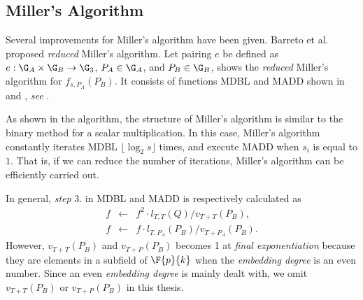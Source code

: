 \subsection{Miller's Algorithm}
Several improvements for Miller's algorithm have been given. Barreto et al. proposed {\it reduced} Miller's algorithm. 
Let pairing $e$ be defined as $e:\G_A\times\G_B\rightarrow\G_3$, $P_A\in\G_A$, and $P_B\in\G_B$,  shows the {\it reduced} Miller's algorithm for $f_{s,P_A}(P_B)$. It consists of functions MDBL and MADD shown in  
and , {\it see} .

As shown in the algorithm, the structure of Miller's algorithm is similar to the binary method for a scalar multiplication.
In this case, Miller's algorithm constantly iterates MDBL $\lfloor\log_2s\rfloor$ times, and execute MADD when $s_i$ is equal to $1$. 
That is, if we can reduce the number of iterations, Miller's algorithm can be efficiently carried out.


In general, {\it step} 3. in MDBL and MADD is respectively calculated as  
\begin{eqnarray*}
f &\leftarrow& f^2\cdot l_{T,T}(Q)/v_{T+T}(P_B),\\
f &\leftarrow& f \cdot l_{T,P_A}(P_B)/v_{T+P_A}(P_B). 
\end{eqnarray*}
However, $v_{T+T}(P_B)$ and $v_{T+P}(P_B)$ becomes 1 at {\it final exponentiation} because they are elements in a subfield of $\F{p}{k}$ when the {\it embedding degree} is an even number.
Since an even {\it embedding degree} is mainly dealt with, we omit $v_{T+T}(P_B)$ or $v_{T+P}(P_B)$ in this thesis.

